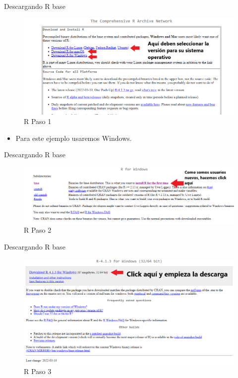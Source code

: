 \documentclass[
  13pt,
  ignorenonframetext,
]{beamer}
\providecommand{\tightlist}{%
  \setlength{\itemsep}{0pt}\setlength{\parskip}{0pt}}
\begin{document}
\begin{frame}{Descargando R base}
\label{descargando-r-base-1}
\begin{figure}[H]
\centering
\includegraphics[keepaspectratio,width=\textwidth, height=.8\textheight]{input/img/img1_1.png}
\caption{R Paso 1}\label{rpaso1}
\end{figure}

\begin{itemize}
\tightlist
\item
  Para este ejemplo usaremos Windows.
\end{itemize}
\end{frame}

\begin{frame}{Descargando R base}
\label{descargando-r-base-2}
\begin{figure}[H]
\centering
\includegraphics[keepaspectratio,width=\textwidth, height=.8\textheight]{input/img/img1_2.png}
\caption{R Paso 2}\label{rpaso2}
\end{figure}
\end{frame}

\begin{frame}{Descargando R base}
\label{descargando-r-base-3}
\begin{figure}[H]
\centering
\includegraphics[keepaspectratio,width=\textwidth, height=.8\textheight]{input/img/img1_3.png}
\caption{R Paso 3}\label{rpaso3}
\end{figure}
\end{frame}
\end{document}
